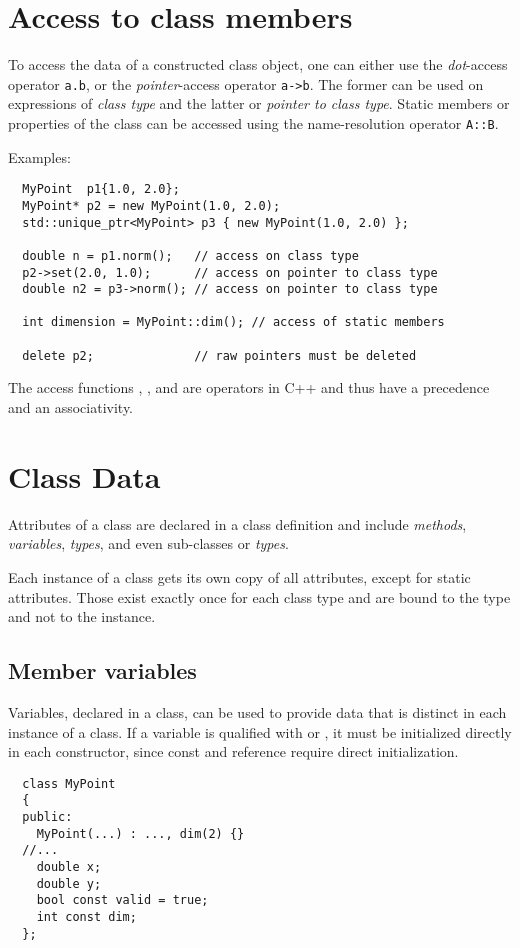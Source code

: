 \section{Access to class members}
To access the data of a constructed class object, one can either use the \textit{dot}-access operator \texttt{a.b},
or the \textit{pointer}-access operator \texttt{a->b}. The former can be used on expressions of \emph{class type} and the latter
or \emph{pointer to class type}. Static members or properties of the class can be accessed using the name-resolution operator \texttt{A::B}.

Examples:
\begin{verbatim}
  MyPoint  p1{1.0, 2.0};
  MyPoint* p2 = new MyPoint(1.0, 2.0);
  std::unique_ptr<MyPoint> p3 { new MyPoint(1.0, 2.0) };

  double n = p1.norm();   // access on class type
  p2->set(2.0, 1.0);      // access on pointer to class type
  double n2 = p3->norm(); // access on pointer to class type

  int dimension = MyPoint::dim(); // access of static members

  delete p2;              // raw pointers must be deleted
\end{verbatim}

\begin{rem}
  The access functions , \cpp{->}, and \cpp{::} are operators in C++ and thus have a precedence and an associativity.
\end{rem}

\section{Class Data\label{sec:class-attributes}}
Attributes of a class are declared in a class definition and include \emph{methods}, \emph{variables}, \emph{types}, and even sub-classes or \emph{types}.

Each instance of a class gets its own copy of all attributes, except for static attributes. Those exist exactly once for each class type and are bound
to the type and not to the instance.

\subsection{Member variables}
Variables, declared in a class, can be used to provide data that is distinct in each instance of a class. If a variable is qualified with  or \cpp{&},
it must be initialized directly in each constructor, since const and reference require direct initialization.
%
\begin{verbatim}
  class MyPoint
  {
  public:
    MyPoint(...) : ..., dim(2) {}
  //...
    double x;
    double y;
    bool const valid = true;
    int const dim;
  };
\end{verbatim}

